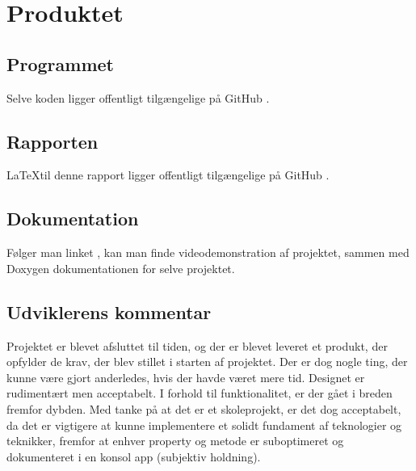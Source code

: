 \chapter{Produktet}
\label{chapter:final-product}

\section{Programmet}
\label{sec:the-program}
Selve koden ligger offentligt tilgængelige på GitHub \cite{the-project}.

\section{Rapporten}
\label{sec:the-report}
\LaTeX til denne rapport ligger offentligt tilgængelige på GitHub \cite{the-report}.

\section{Dokumentation}
\label{sec:the-documentation}
Følger man linket \cite{the-auxiliary}, kan man finde videodemonstration af projektet, sammen med Doxygen dokumentationen for selve projektet. 

\section{Udviklerens kommentar}
\label{sec:the-developers-comment}
Projektet er blevet afsluttet til tiden, og der er blevet leveret et produkt, der opfylder de krav, der blev stillet i starten af projektet.
Der er dog nogle ting, der kunne være gjort anderledes, hvis der havde været mere tid. Designet er rudimentært men acceptabelt.
I forhold til funktionalitet, er der gået i breden fremfor dybden. Med tanke på at det er et skoleprojekt, er det dog acceptabelt, da det er vigtigere at kunne
implementere et solidt fundament af teknologier og teknikker, fremfor at enhver property og metode er suboptimeret og dokumenteret i en konsol app (subjektiv holdning).  
